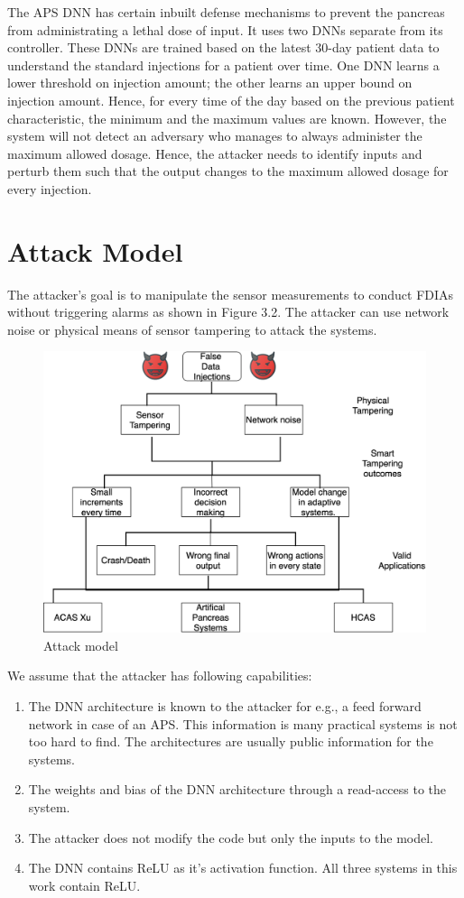 The \ac{APS} \ac{DNN} has certain inbuilt defense mechanisms to prevent the pancreas  from administrating a lethal dose of input. 
It uses two \ac{DNN}s separate from its controller. 
These \ac{DNN}s are trained based on the latest 30-day patient data to understand the standard injections for a patient over time. 
One \ac{DNN} learns a lower threshold on injection amount; the other learns an upper bound on injection amount. 
Hence, for every time of the day based on the previous patient characteristic, the minimum and the maximum values are known. 
However, the system will not detect  an adversary  who manages to always administer the maximum allowed dosage.  
Hence, the attacker needs to identify inputs and  perturb them  such that the output changes to the maximum  allowed dosage for every injection.  



\section{Attack Model}
The attacker's goal is to manipulate the sensor measurements to conduct FDIAs without triggering alarms as shown in Figure 3.2. 
The attacker can use network noise or physical means of sensor tampering to attack the systems. 
 
 
\begin{figure}
	\centering
	\includegraphics[width=0.7\linewidth]{Images/Attackmodelphysical}
	\caption{Attack model}
	\label{fig:attackmodelphysical}
\end{figure}

We assume that the attacker has following capabilities:
\begin{enumerate}
	\item The \ac{DNN}  architecture  is known to the attacker for e.g., a feed forward  network in case of an \ac{APS}. This information is many  practical systems is not too hard to find.  The architectures are  usually public information for the systems. 
	\item  The weights and bias of the \ac{DNN}  architecture through a read-access to the system.  
	\item The attacker does not modify the code but only the inputs to the model.
	\item The \ac{DNN} contains ReLU as it's activation function. 
	All three systems in this work contain ReLU.
\end{enumerate}

